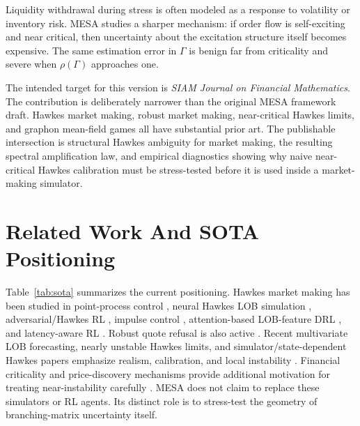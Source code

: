 \documentclass[11pt]{article}
\begin{document}
Liquidity withdrawal during stress is often modeled as a response to volatility
or inventory risk. MESA studies a sharper mechanism: if order flow is
self-exciting and near critical, then uncertainty about the excitation
structure itself becomes expensive. The same estimation error in $\Gamma$ is
benign far from criticality and severe when $\rho(\Gamma)$ approaches one.

The intended target for this version is \emph{SIAM Journal on Financial
Mathematics}. The contribution is deliberately narrower than the original MESA
framework draft. Hawkes market making, robust market making, near-critical
Hawkes limits, and graphon mean-field games all have substantial prior art. The
publishable intersection is structural Hawkes ambiguity for market making, the
resulting spectral amplification law, and empirical diagnostics showing why
naive near-critical Hawkes calibration must be stress-tested before it is used
inside a market-making simulator.

\section{Related Work And SOTA Positioning}

Table~\ref{tab:sota} summarizes the current positioning. Hawkes market making
has been studied in point-process control \cite{LawViens2019}, neural Hawkes
LOB simulation \cite{LalorSwishchuk2025,Kumar2024}, adversarial/Hawkes RL
\cite{WangHawkesARL2025}, impulse control \cite{Jain2025}, attention-based
LOB-feature DRL \cite{GuoAttnLOB2023}, and latency-aware
RL \cite{Jiang2025}. Robust quote refusal is also active
\cite{WangNoQuote2025}. Recent multivariate LOB forecasting, nearly unstable
Hawkes limits, and simulator/state-dependent Hawkes papers emphasize realism,
calibration, and local instability
\cite{Raffaelli2026,SzymanskiXu2025,ElKarmi2026,ElKarmiSimulator2025,Noble2026,Kimura2026}.
Financial criticality and price-discovery mechanisms provide additional
motivation for treating near-instability carefully
\cite{Hardiman2013,Kang2026}. MESA does not claim to replace these simulators
or RL agents. Its distinct role is to stress-test the geometry of
branching-matrix uncertainty itself.
\end{document}
